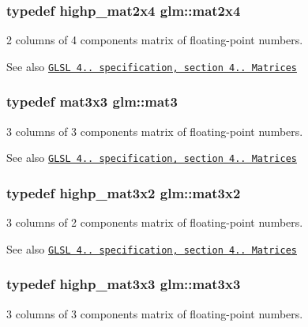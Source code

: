\subsubsection[{\texorpdfstring{mat2x4}{mat2x4}}]{\setlength{\rightskip}{0pt plus 5cm}typedef highp\+\_\+mat2x4 {\bf glm\+::mat2x4}}\hypertarget{group__core__types_gaa9bfb36efaf88ecad32369ec8a01d901}{}\label{group__core__types_gaa9bfb36efaf88ecad32369ec8a01d901}
2 columns of 4 components matrix of floating-\/point numbers.

\begin{DoxySeeAlso}{See also}
\href{http://www.opengl.org/registry/doc/GLSLangSpec.4.20.8.pdf}{\tt G\+L\+SL 4.. specification, section 4.. Matrices} 
\end{DoxySeeAlso}
\subsubsection[{\texorpdfstring{mat3}{mat3}}]{\setlength{\rightskip}{0pt plus 5cm}typedef mat3x3 {\bf glm\+::mat3}}\hypertarget{group__core__types_gadfaff2a7dce5cbf4e77a47ecea42ac5b}{}\label{group__core__types_gadfaff2a7dce5cbf4e77a47ecea42ac5b}
3 columns of 3 components matrix of floating-\/point numbers.

\begin{DoxySeeAlso}{See also}
\href{http://www.opengl.org/registry/doc/GLSLangSpec.4.20.8.pdf}{\tt G\+L\+SL 4.. specification, section 4.. Matrices} 
\end{DoxySeeAlso}
\subsubsection[{\texorpdfstring{mat3x2}{mat3x2}}]{\setlength{\rightskip}{0pt plus 5cm}typedef highp\+\_\+mat3x2 {\bf glm\+::mat3x2}}\hypertarget{group__core__types_gad7476e0e866186f12ee87975c6b01552}{}\label{group__core__types_gad7476e0e866186f12ee87975c6b01552}
3 columns of 2 components matrix of floating-\/point numbers.

\begin{DoxySeeAlso}{See also}
\href{http://www.opengl.org/registry/doc/GLSLangSpec.4.20.8.pdf}{\tt G\+L\+SL 4.. specification, section 4.. Matrices} 
\end{DoxySeeAlso}
\subsubsection[{\texorpdfstring{mat3x3}{mat3x3}}]{\setlength{\rightskip}{0pt plus 5cm}typedef highp\+\_\+mat3x3 {\bf glm\+::mat3x3}}\hypertarget{group__core__types_ga6fecca6a869070b6bf8acb44ce1c2af3}{}\label{group__core__types_ga6fecca6a869070b6bf8acb44ce1c2af3}
3 columns of 3 components matrix of floating-\/point numbers.

